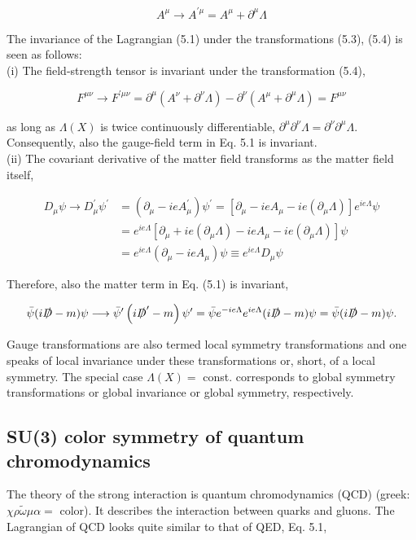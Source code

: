 \documentclass[10pt, letterpaper]{article}
\begin{document}
$$
A^{\mu} \longrightarrow A^{\prime \mu}=A^{\mu}+\partial^{\mu} \Lambda
$$

The invariance of the Lagrangian (5.1) under the transformations (5.3), (5.4) is seen as follows:\\
(i) The field-strength tensor is invariant under the transformation (5.4),

$$
F^{\mu \nu} \longrightarrow F^{\prime \mu \nu}=\partial^{\mu}\left(A^{\nu}+\partial^{\nu} \Lambda\right)-\partial^{\nu}\left(A^{\mu}+\partial^{\mu} \Lambda\right)=F^{\mu \nu}
$$

as long as $\Lambda(X)$ is twice continuously differentiable, $\partial^{\mu} \partial^{\nu} \Lambda=\partial^{\nu} \partial^{\mu} \Lambda$. Consequently, also the gauge-field term in Eq. 5.1 is invariant.\\
(ii) The covariant derivative of the matter field transforms as the matter field itself,

$$
\begin{aligned}
D_{\mu} \psi \longrightarrow D_{\mu}^{\prime} \psi^{\prime} & =\left(\partial_{\mu}-i e A_{\mu}^{\prime}\right) \psi^{\prime}=\left[\partial_{\mu}-i e A_{\mu}-i e\left(\partial_{\mu} \Lambda\right)\right] e^{i e \Lambda} \psi \\
& =e^{i e \Lambda}\left[\partial_{\mu}+i e\left(\partial_{\mu} \Lambda\right)-i e A_{\mu}-i e\left(\partial_{\mu} \Lambda\right)\right] \psi \\
& =e^{i e \Lambda}\left(\partial_{\mu}-i e A_{\mu}\right) \psi \equiv e^{i e \Lambda} D_{\mu} \psi
\end{aligned}
$$

Therefore, also the matter term in Eq. (5.1) is invariant,

$$
\bar{\psi}(i \slashed{D}-m) \psi \longrightarrow \bar{\psi}^{\prime}\left(i \slashed{D}^{\prime}-m\right) \psi^{\prime}=\bar{\psi} e^{-i e \Lambda} e^{i e \Lambda}(i \slashed{D}-m) \psi=\bar{\psi}(i \slashed{D}-m) \psi .
$$

Gauge transformations are also termed local symmetry transformations and one speaks of local invariance under these transformations or, short, of a local symmetry. The special case $\Lambda(X)=$ const. corresponds to global symmetry transformations or global invariance or global symmetry, respectively.






\subsection{SU(3) color symmetry of quantum chromodynamics}
The theory of the strong interaction is quantum chromodynamics (QCD) (greek: $\chi \rho \widetilde{\omega} \mu \alpha=$ color). It describes the interaction between quarks and gluons. The Lagrangian of QCD looks quite similar to that of QED, Eq. 5.1,
\end{document}
